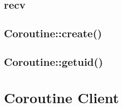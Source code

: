 \subsection{recv}





\subsection{Coroutine::create()}





\subsection{Coroutine::getuid()}



\section{Coroutine Client}






























